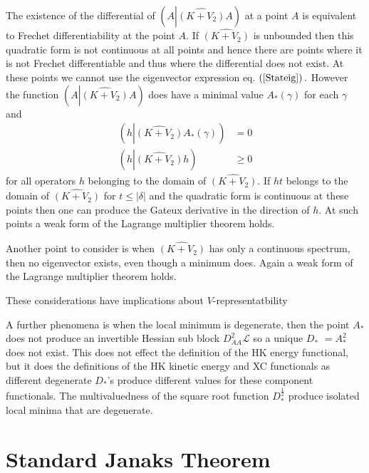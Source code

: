 \documentclass[aps,preprint]{revtex4}%
\begin{document}
The existence of the differential of $\left(  A\left\vert \widehat{\left(
K+V_{2}\right)  }A\right.  \right)  $ at a point $A$ is equivalent to Frechet
differentiability at the point $A$. If $\widehat{\left(  K+V_{2}\right)  }$ is
unbounded then this quadratic form is not continuous at all points and hence
there are points where it is not Frechet differentiable and thus where the
differential does not exist. At these points we cannot use the eigenvector
expression eq. $\left(  \ref{Stateig}\right)  .$ However the function $\left(
A\left\vert \widehat{\left(  K+V_{2}\right)  }A\right.  \right)  $ does have a
minimal value $A_{\ast}\left(  \gamma\right)  $ for each $\gamma$ and
\begin{align}
\left(  h\left\vert \widehat{\left(  K+V_{2}\right)  }A_{\ast}\left(
\gamma\right)  \right.  \right)   &  =0\\
\left(  h\left\vert \widehat{\left(  K+V_{2}\right)  }h\right.  \right)   &
\geq0
\end{align}
for all operators $h$ belonging to the domain of $\widehat{\left(
K+V_{2}\right)  }.$ If $ht$ belongs to the domain of $\widehat{\left(
K+V_{2}\right)  }$ for $t\leq\left\vert \delta\right\vert $ and the quadratic
form is continuous at these points then one can produce the Gateux derivative
in the direction of $h.$ At such points a weak form of the Lagrange multiplier
theorem holds.

Another point to consider is when $\widehat{\left(  K+V_{2}\right)  }$ has
only a continuous spectrum, then no eigenvector exists, even though a minimum
does. Again a weak form of the Lagrange multiplier theorem holds.

These considerations have implications about $V$-representatbility \cite{Vrep}

A further phenomena is when the local minimum is degenerate, then the point
$A_{\ast}$ does not produce an invertible Hessian sub block $D_{AA}%
^{2}\mathcal{L}$ so a unique $D_{\ast}$ $=A_{\ast}^{2}$ does not exist. This
does not effect the definition of the HK energy functional, but it does the
definitions of the HK kinetic energy and XC functionals as different
degenerate $D_{\ast}$'s produce different values for these component
functionals. The multivaluedness of the square root function $D_{\ast}%
^{\frac{1}{2}}$ produce isolated local minima that are degenerate.

\section{Standard Janaks Theorem\label{Standard}}
\end{document}
